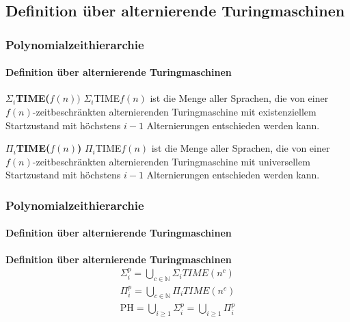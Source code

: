 \subsection{Definition über alternierende Turingmaschinen}
\begin{frame}
    \frametitle{Polynomialzeithierarchie}
    \framesubtitle{Definition über alternierende Turingmaschinen}
    \begin{block}{\textbf{$\Sigma_i$TIME($f(n))$}}
        $\Sigma_i$TIME$f(n)$ ist die Menge aller Sprachen, die von einer $f(n)$-zeitbeschränkten alternierenden Turingmaschine mit existenziellem Startzustand mit höchstens $i-1$ Alternierungen entschieden werden kann.
    \end{block}
    \begin{block}{\textbf{$\Pi_i$TIME($f(n)$)}}
        $\Pi_i$TIME$f(n)$ ist die Menge aller Sprachen, die von einer $f(n)$-zeitbeschränkten alternierenden Turingmaschine mit universellem Startzustand mit höchstens $i-1$ Alternierungen entschieden werden kann.
    \end{block}
    
\end{frame}

\begin{frame}
    \frametitle{Polynomialzeithierarchie}
    \framesubtitle{Definition über alternierende Turingmaschinen}
    \begin{block}{\textbf{Definition über alternierende Turingmaschinen}}
        \begin{align*}
            \Sigma^p_i = \bigcup_{c \in \mathbb{N}} \Sigma_i TIME(n^c) \\
            \Pi^p_i = \bigcup_{c \in \mathbb{N}} \Pi_i TIME(n^c) \\
            \text{PH} = \bigcup_{i \geq 1} \Sigma^p_i = \bigcup_{i \geq 1} \Pi^p_i 
        \end{align*}
    \end{block}
\end{frame}

